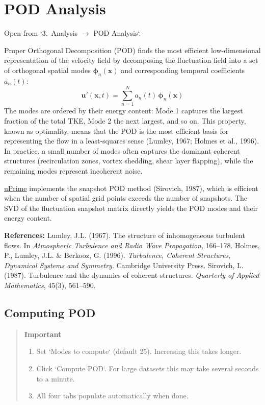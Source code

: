 \section{POD Analysis}
\label{ch:pod}

Open from `3.\ Analysis $\to$ POD Analysis`.

Proper Orthogonal Decomposition (POD) finds the most efficient low-dimensional representation of the velocity field by decomposing the fluctuation field into a set of orthogonal spatial modes $\boldsymbol{\phi}_n(\mathbf{x})$ and corresponding temporal coefficients $a_n(t)$:
\[
\mathbf{u}'(\mathbf{x}, t) = \sum_{n=1}^{N} a_n(t)\,\boldsymbol{\phi}_n(\mathbf{x})
\]
The modes are ordered by their energy content: Mode 1 captures the largest fraction of the total TKE, Mode 2 the next largest, and so on. This property, known as optimality, means that the POD is the most efficient basis for representing the flow in a least-squares sense (Lumley, 1967; Holmes et al., 1996). In practice, a small number of modes often captures the dominant coherent structures (recirculation zones, vortex shedding, shear layer flapping), while the remaining modes represent incoherent noise.

\href{https://cmdrryder.github.io/uPrime/}{uPrime} implements the snapshot POD method (Sirovich, 1987), which is efficient when the number of spatial grid points exceeds the number of snapshots. The SVD of the fluctuation snapshot matrix directly yields the POD modes and their energy content.

\noindent\textbf{References:} Lumley, J.L. (1967). The structure of inhomogeneous turbulent flows. In \textit{Atmospheric Turbulence and Radio Wave Propagation}, 166--178. Holmes, P., Lumley, J.L. \& Berkooz, G. (1996). \textit{Turbulence, Coherent Structures, Dynamical Systems and Symmetry}. Cambridge University Press. Sirovich, L. (1987). Turbulence and the dynamics of coherent structures. \textit{Quarterly of Applied Mathematics}, 45(3), 561--590.

\subsection{Computing POD}

\begin{quote}
\textbf{Important}
\begin{enumerate}[leftmargin=1.5em, topsep=2pt]
  \item Set `Modes to compute` (default 25). Increasing this takes longer.
  \item Click `Compute POD`. For large datasets this may take several seconds to a minute.
  \item All four tabs populate automatically when done.
\end{enumerate}
\end{quote}

